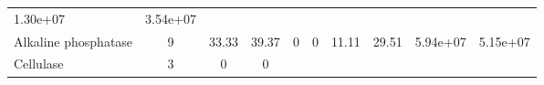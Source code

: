 \documentclass[]{article}
\begin{document}
\begin{longtable}[]{@{}lccccccccc@{}}
\begin{minipage}[t]{0.08\columnwidth}
1.30e+07\strut
\end{minipage} & \begin{minipage}[t]{0.08\columnwidth}\centering\strut
3.54e+07\strut
\end{minipage}\tabularnewline
\begin{minipage}[t]{0.07\columnwidth}\raggedright\strut
Alkaline phosphatase\strut
\end{minipage} & \begin{minipage}[t]{0.06\columnwidth}\centering\strut
9\strut
\end{minipage} & \begin{minipage}[t]{0.08\columnwidth}\centering\strut
33.33\strut
\end{minipage} & \begin{minipage}[t]{0.08\columnwidth}\centering\strut
39.37\strut
\end{minipage} & \begin{minipage}[t]{0.08\columnwidth}\centering\strut
0\strut
\end{minipage} & \begin{minipage}[t]{0.08\columnwidth}\centering\strut
0\strut
\end{minipage} & \begin{minipage}[t]{0.08\columnwidth}\centering\strut
11.11\strut
\end{minipage} & \begin{minipage}[t]{0.08\columnwidth}\centering\strut
29.51\strut
\end{minipage} & \begin{minipage}[t]{0.08\columnwidth}\centering\strut
5.94e+07\strut
\end{minipage} & \begin{minipage}[t]{0.08\columnwidth}\centering\strut
5.15e+07\strut
\end{minipage}\tabularnewline
\begin{minipage}[t]{0.07\columnwidth}\raggedright\strut
Cellulase\strut
\end{minipage} & \begin{minipage}[t]{0.06\columnwidth}\centering\strut
3\strut
\end{minipage} & \begin{minipage}[t]{0.08\columnwidth}\centering\strut
0\strut
\end{minipage} & \begin{minipage}[t]{0.08\columnwidth}\centering\strut
0\strut
\end{minipage} & \begin{minipage}[t]{0.08\columnwidth}\centering\strut

\end{minipage}
\end{longtable}
\end{document}
